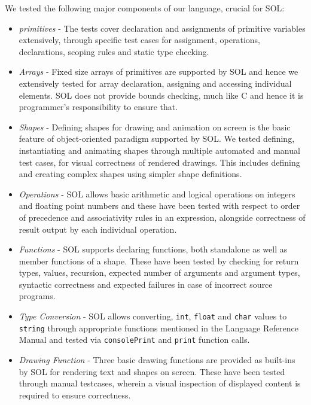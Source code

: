 \documentclass[letterpaper,12pt]{report}
\begin{document}
    We tested the following major components of our language, crucial for SOL:
    \begin{itemize}
      \itemsep 0em
      \item \textit{primitives} - The tests cover declaration and assignments of primitive variables extensively, through specific test cases for assignment, operations, declarations, scoping rules and static type checking.

      \item \textit{Arrays} - Fixed size arrays of primitives are supported by SOL and hence we extensively tested for array declaration, assigning and accessing individual elements. SOL does not provide bounds checking, much like C and hence it is programmer's responsibility to ensure that.

      \item \textit{Shapes} - Defining shapes for drawing and animation on screen is the basic feature of object-oriented paradigm supported by SOL. We tested defining, instantiating and animating shapes through multiple automated and manual test cases, for visual correctness of rendered drawings. This includes defining and creating complex shapes using simpler shape definitions.

      \item \textit{Operations} - SOL allows basic arithmetic and logical operations on integers and floating point numbers and these have been tested with respect to order of precedence and associativity rules in an expression, alongside correctness of result output by each individual operation.

      \item \textit{Functions} - SOL supports declaring functions, both standalone as well as member functions of a shape. These have been tested by checking for return types, values, recursion, expected number of arguments and argument types, syntactic correctness and expected failures in case of incorrect source programs.

      \item \textit{Type Conversion} - SOL allows converting, \texttt{int}, \texttt{float} and \texttt{char} values to \texttt{string} through appropriate functions mentioned in the Language Reference Manual and tested via \texttt{consolePrint} and \texttt{print} function calls.

      \item \textit{Drawing Function} - Three basic drawing functions are provided as built-ins by SOL for rendering text and shapes on screen. These have been tested through manual testcases, wherein a visual inspection of displayed content is required to ensure correctness.


\end{itemize}
\end{document}
